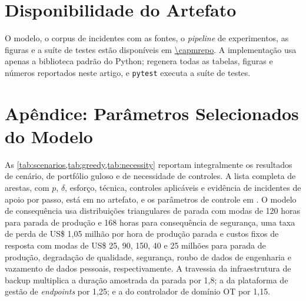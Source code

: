 \section*{Disponibilidade do Artefato}

O modelo, o corpus de incidentes com as fontes, o \emph{pipeline} de
experimentos, as figuras e a suíte de testes estão disponíveis em
\url{\capmrepo}. A implementação usa apenas a
biblioteca padrão do Python;  regenera
todas as tabelas, figuras e números reportados neste artigo, e \texttt{pytest}
executa a suíte de testes.

\appendix
\section*{Apêndice: Parâmetros Selecionados do Modelo}

As \cref{tab:scenarios,tab:greedy,tab:necessity} reportam integralmente os
resultados de cenário, de portfólio guloso e de necessidade de controles. A
lista completa de arestas, com $p$, $\delta$, esforço, técnica, controles
aplicáveis e evidência de incidentes de apoio por passo, está em
 no artefato, e os parâmetros de controle em
. O modelo de consequência usa distribuições
triangulares de parada com modas de 120 horas para parada de produção e 168
horas para consequência de segurança, uma taxa de perda de US\$ 1,05 milhão por
hora de produção parada e custos fixos de resposta com modas de US\$ 25, 90,
150, 40 e 25 milhões para parada de produção, degradação de qualidade,
segurança, roubo de dados de engenharia e vazamento de dados pessoais,
respectivamente. A travessia da infraestrutura de backup multiplica a duração
amostrada da parada por 1,8; a da plataforma de gestão de \emph{endpoints} por
1,25; e a do controlador de domínio OT por 1,15.




